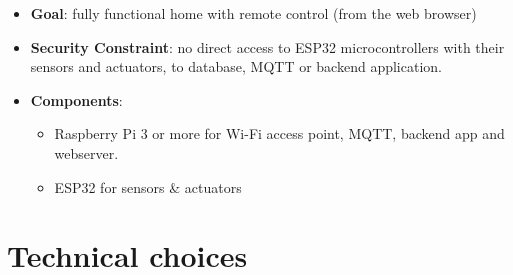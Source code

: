 \documentclass{report}
\begin{document}
        \begin{itemize}
        \item \textbf{Goal}: fully functional home with remote control (from the web browser)
        \item \textbf{Security Constraint}: no direct access to ESP32 microcontrollers with their sensors and actuators, to database, MQTT or backend application.
        \item \textbf{Components}:
            \begin{itemize}
                \item Raspberry Pi 3 or more for Wi-Fi access point, MQTT, backend app and webserver.
                \item ESP32 for sensors \& actuators
            \end{itemize}
        \end{itemize}

    \section{Technical choices}\label{sec:technical-choices}
\end{document}
